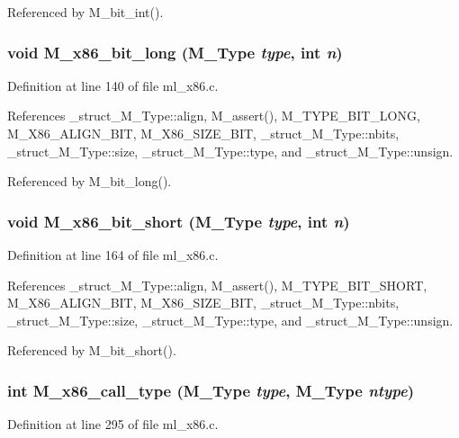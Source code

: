 Referenced by M\_\-bit\_\-int().
\subsubsection{\setlength{\rightskip}{0pt plus 5cm}void M\_\-x86\_\-bit\_\-long (\bf{M\_\-Type} {\em type}, int {\em n})}\label{m__x86_8h_b8150acbba1ed418ca4270bf08c272e9}




Definition at line 140 of file ml\_\-x86.c.

References \_\-struct\_\-M\_\-Type::align, M\_\-assert(), M\_\-TYPE\_\-BIT\_\-LONG, M\_\-X86\_\-ALIGN\_\-BIT, M\_\-X86\_\-SIZE\_\-BIT, \_\-struct\_\-M\_\-Type::nbits, \_\-struct\_\-M\_\-Type::size, \_\-struct\_\-M\_\-Type::type, and \_\-struct\_\-M\_\-Type::unsign.

Referenced by M\_\-bit\_\-long().
\subsubsection{\setlength{\rightskip}{0pt plus 5cm}void M\_\-x86\_\-bit\_\-short (\bf{M\_\-Type} {\em type}, int {\em n})}\label{m__x86_8h_7a8e1bb7913aaa8f58b14629c5821149}




Definition at line 164 of file ml\_\-x86.c.

References \_\-struct\_\-M\_\-Type::align, M\_\-assert(), M\_\-TYPE\_\-BIT\_\-SHORT, M\_\-X86\_\-ALIGN\_\-BIT, M\_\-X86\_\-SIZE\_\-BIT, \_\-struct\_\-M\_\-Type::nbits, \_\-struct\_\-M\_\-Type::size, \_\-struct\_\-M\_\-Type::type, and \_\-struct\_\-M\_\-Type::unsign.

Referenced by M\_\-bit\_\-short().
\subsubsection{\setlength{\rightskip}{0pt plus 5cm}int M\_\-x86\_\-call\_\-type (\bf{M\_\-Type} {\em type}, \bf{M\_\-Type} {\em ntype})}\label{m__x86_8h_3f585d5c1788111d3cdb147a17a3fa09}




Definition at line 295 of file ml\_\-x86.c.

